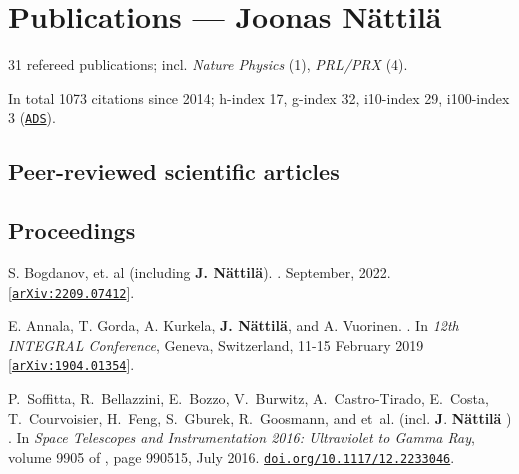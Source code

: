 \documentclass[10pt]{article}
\begin{document}
\section*{Publications --- Joonas N\"attil\"a}
31 refereed publications; 
incl. 
\textit{Nature Physics} (1), 
\textit{PRL/PRX} (4).

\noindent
In total 1073 citations since 2014; h-index 17, g-index 32, i10-index 29, i100-index 3 (\href{http://adsabs.harvard.edu/cgi-bin/abs_connect?author=nattila,+J.&aut_syn=YES&return_req=no_params}{\nolinkurl{ADS}}).

\subsection*{\phantom{sub} Peer-reviewed scientific articles}

\vspace{-20pt}
\renewcommand\refname{\phantom{bla}}




\nocite{*}



\subsection*{\phantom{sub} Proceedings}
\vspace{-20pt}
\begin{thebibliography}{1}
\vspace{-5pt}


S. Bogdanov, et. al (including \textbf{J. N\"attil\"a}).
.
\newblock September, 2022.
[\href{https://arxiv.org/abs/2209.07412}{\nolinkurl{arXiv:2209.07412}}].






E. {Annala}, T. {Gorda}, A. {Kurkela}, \textbf{J. {N{\"a}ttil{\"a}}}, and A. {Vuorinen}.
.
\newblock In {\em 12th INTEGRAL Conference}, Geneva, Switzerland, 11-15 February 2019
[\href{https://arxiv.org/abs/1904.01354}{\nolinkurl{arXiv:1904.01354}}].

P.~{Soffitta}, R.~{Bellazzini}, E.~{Bozzo}, V.~{Burwitz}, A.~{Castro-Tirado},
  E.~{Costa}, T.~{Courvoisier}, H.~{Feng}, S.~{Gburek}, R.~{Goosmann}, and
  et~al. (incl. \textbf{J}. \textbf{{N{\"a}ttil{\"a}}} )
.
\newblock In {\em Space Telescopes and Instrumentation 2016: Ultraviolet to
  Gamma Ray}, volume 9905 of {\em \procspie}, page 990515, July 2016.
\href{https://doi.org/10.1117/12.2233046}{\nolinkurl{doi.org/10.1117/12.2233046}}.

\end{thebibliography}
\end{document}
